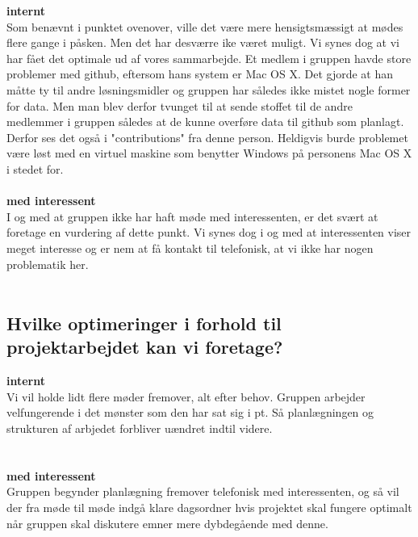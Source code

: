 \documentclass[a4paper,12pt]{article}
\begin{document}
\textbf{internt}
\\
Som benævnt i punktet ovenover, ville det være mere hensigtsmæssigt at mødes flere gange i påsken. Men det har desværre ike været muligt. Vi synes dog at vi har fået det optimale ud af vores sammarbejde.
Et medlem i gruppen havde store problemer med github, eftersom hans system er Mac OS X. Det gjorde at han måtte ty til andre løsningsmidler og gruppen har således ikke mistet nogle former for data. Men man blev derfor tvunget til at sende stoffet til de andre medlemmer i gruppen således at de kunne overføre data til github som planlagt. Derfor ses det også i "contributions" fra denne person. Heldigvis burde problemet være løst med en virtuel maskine som benytter Windows på personens Mac OS X i stedet for.
\\
\\
\textbf{med interessent}
\\
I og med at gruppen ikke har haft møde med interessenten, er det svært at foretage en vurdering af dette punkt. Vi synes dog i og med at interessenten viser meget interesse og er nem at få kontakt til telefonisk, at vi ikke har nogen problematik her. 
\\
\\
\subsection{Hvilke optimeringer i forhold til projektarbejdet kan vi foretage?}

\textbf{internt}
\\
Vi vil holde lidt flere møder fremover, alt efter behov. Gruppen arbejder velfungerende i det mønster som den har sat sig i pt. Så planlægningen og strukturen af arbjedet forbliver uændret indtil videre.
\\ 
\\
\\
\textbf{med interessent}
\\
Gruppen begynder planlægning fremover telefonisk med interessenten, og så vil der fra møde til møde indgå klare dagsordner hvis projektet skal fungere optimalt når gruppen skal diskutere emner mere dybdegående med denne.  
\end{document}
